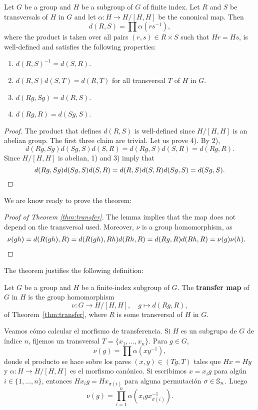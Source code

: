 \begin{lemma}
	\label{lem:d}
	Let $G$ be a group and $H$ be a subgroup of $G$ of finite index.  Let $R$
	and $S$ be transversals of $H$ in $G$ and let $\alpha\colon H\to H/[H,H]$
	be the canonical map. Then 
	\[
		d(R,S)=\prod \alpha(rs^{-1}),
	\]
	where the product is taken over all pairs 
	$(r,s)\in R\times S$ such that $Hr=Hs$,
	is well-defined and satisfies the following properties:
	\begin{enumerate}
		\item $d(R,S)^{-1}=d(S,R)$.
		\item $d(R,S)d(S,T)=d(R,T)$ for all transversal $T$ of $H$ in $G$.
		\item $d(Rg,Sg)=d(R,S)$.
		\item $d(Rg,R)=d(Sg,S)$.
	\end{enumerate}
\end{lemma}

\begin{proof}
	The product that defines $d(R,S)$ is well-defined since $H/[H,H]$ is 
	an abelian group. The first three claim are trivial. Let us prove
	4). By 2), 
	\[
		d(Rg,Sg)d(Sg,S)d(S,R)=d(Rg,S)d(S,R)=d(Rg,R).
	\]
	Since $H/[H,H]$ is abelian, 1) and 3) imply that 	
	\[
		d(Rg,Sg)d(Sg,S)d(S,R)=d(R,S)d(S,R)d(Sg,S)=d(Sg,S).\qedhere
	\]
\end{proof}

We are know ready to prove the theorem: 

\begin{proof}[Proof of Theorem \ref{thm:transfer}]
	The lemma implies that the map does not depend on the transversal used. 
	Moreover, $\nu$ is a group homomorphism, as 
	\begin{align*}
		\nu(gh)&=d(R(gh),R)
		=d(R(gh),Rh)d(Rh,R)
		=d(Rg,R)d(Rh,R)=\nu(g)\nu(h).\qedhere
	\end{align*}
\end{proof}

The theorem justifies the following definition: 

\begin{definition}
	Let $G$ be a group and $H$ be a finite-index subgroup of $G$. The
	\textbf{transfer map} of $G$ in $H$ is the group homomorphism 
	\[
		\nu\colon G\to H/[H,H],
		\quad
		g\mapsto d(Rg,R),
	\]
	of Theorem~\ref{thm:transfer}, where $R$ is some transversal of $H$ in $G$.
\end{definition}

Veamos cómo calcular el morfismo de transferencia. Si $H$ es un subgrupo de $G$
de índice $n$, fijemos un transversal $T=\{x_1,\dots,x_n\}$. Para $g\in G$, 
\[
	\nu(g)=\prod \alpha(xy^{-1}),
\]
donde el producto se hace sobre los pares $(x,y)\in (Tg,T)$ tales que $Hx=Hy$
y $\alpha\colon H\to H/[H,H]$ es el morfismo canónico. 
Si escribimos
$x=x_ig$ para algún $i\in\{1,\dots,n\}$, entonces 
$Hx_ig=Hx_{\sigma(i)}$ para alguna permutación $\sigma\in\mathbb{S}_n$. Luego
\[
	\nu(g)=\prod_{i=1}^n\alpha(x_igx_{\sigma(i)}^{-1}).
\]

